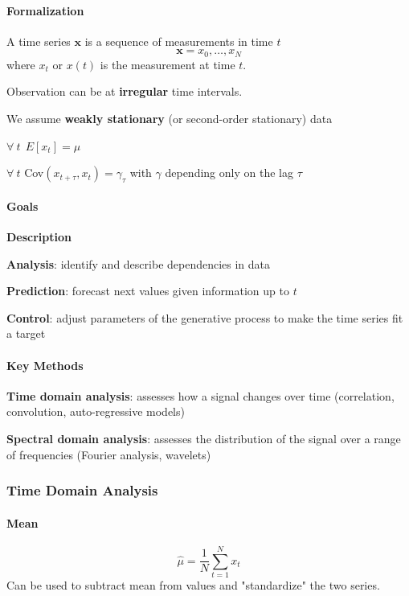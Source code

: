 \documentclass[10pt]{report}
\begin{document}
\paragraph{Formalization} A time series $\mathbf{x}$ is a sequence of measurements in time $t$
$$\mathbf{x} = x_0,\ldots,x_N$$
where $x_t$ or $x(t)$ is the measurement at time $t$.
\begin{list}{}{}
	\item Observation can be at \textbf{irregular} time intervals.
	\item We assume \textbf{weakly stationary} (or second-order stationary) data\begin{list}{}{}
		\item $\forall\:t\:\:E[x_t] = \mu$
		\item $\forall\:t$ Cov$(x_{t+\tau},x_t) = \gamma_\tau$ with $\gamma$ depending only on the lag $\tau$
	\end{list}
\end{list}
\paragraph{Goals}\begin{list}{}{}
	\item \textbf{Description}
	\item \textbf{Analysis}: identify and describe dependencies in data
	\item \textbf{Prediction}: forecast next values given information up to $t$
	\item \textbf{Control}: adjust parameters of the generative process to make the time series fit a target
\end{list}
\paragraph{Key Methods}\begin{list}{}{}
	\item \textbf{Time domain analysis}: assesses how a signal changes over time (correlation, convolution, auto-regressive models)
	\item \textbf{Spectral domain analysis}: assesses the distribution of the signal over a range of frequencies (Fourier analysis, wavelets)
\end{list}
\subsubsection{Time Domain Analysis}
\paragraph{Mean} $$\hat\mu=\frac{1}{N}\sum_{t=1}^N x_t$$
Can be used to subtract mean from values and "standardize" the two series.
\end{document}
